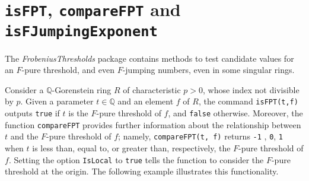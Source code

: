 \documentclass{amsart}
\begin{document}
%
%

\section{{\tt isFPT}, {\tt compareFPT} and {\tt isFJumpingExponent}}
\label{sec.IsFPT}

The \emph{FrobeniusThresholds} package contains methods to
 test candidate values for an $F$-pure threshold, and even $F$-jumping numbers, even in some singular rings.

Consider a  $\mathbb{Q}$-Gorenstein ring $R$ of characteristic $p>0$, whose index not divisible by $p$.
Given a parameter $t \in \mathbb{Q}$ and an element $f$ of $R$, the command {\tt isFPT(t,f)} outputs {\tt true} if $t$ is the $F$-pure threshold of $f$, and {\tt false} otherwise.
Moreover, the function {\tt compareFPT} provides further information about the relationship between $t$ and the $F$-pure threshold of $f$; namely,
{\tt compareFPT(t, f)} returns {\tt-1} , {\tt 0}, {\tt 1} when $t$ is less than, equal to, or greater than, respectively, the $F$-pure threshold of $f$.  Setting the option {\tt IsLocal} to {\tt true} tells the function to consider the $F$-pure threshold at the origin.  The following example illustrates this functionality.
\end{document}
